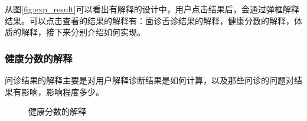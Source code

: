 从图\ref{fig:exp_result}可以看出有解释的设计中，用户点击结果后，会通过弹框解释结果。可以点击查看的结果的解释有：面诊舌诊结果的解释，健康分数的解释，体质的解释，接下来分别介绍如何实现。

\subsubsection{健康分数的解释}
问诊结果的解释主要是对用户解释诊断结果是如何计算，以及那些问诊的问题对结果有影响，影响程度多少。

\begin{figure}[htbp]
    \centering
    \caption{健康分数的解释}
    \label{fig:report_expalin_score}
\end{figure}

